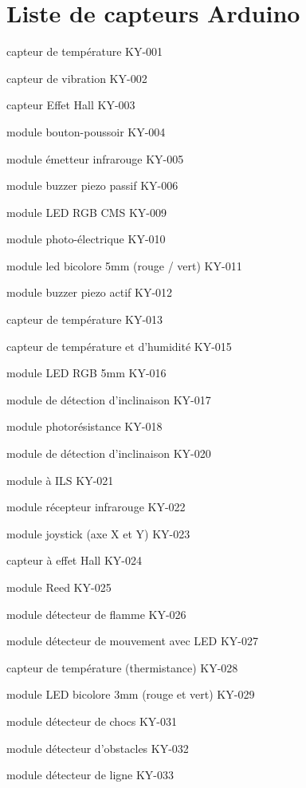 \section{Liste de capteurs Arduino}
\begin{liste}
    \item capteur de température KY-001
    \item capteur de vibration KY-002
    \item capteur Effet Hall KY-003
    \item module bouton-poussoir KY-004
    \item module émetteur infrarouge KY-005
    \item module buzzer piezo passif KY-006
    \item module LED RGB CMS KY-009 
    \item module photo-électrique KY-010 
    \item module led bicolore 5mm (rouge / vert) KY-011
    \item module buzzer piezo actif KY-012 
    \item capteur de température KY-013 
    \item capteur de température et d'humidité KY-015 
    \item module LED RGB 5mm KY-016 
    \item module de détection d'inclinaison KY-017 
    \item module photorésistance KY-018 
    \item module de détection d'inclinaison KY-020 
    \item module à ILS KY-021 
    \item module récepteur infrarouge KY-022 
    \item module joystick (axe X et Y) KY-023 
    \item capteur à effet Hall KY-024
    \item module Reed KY-025 
    \item module détecteur de flamme KY-026 
    \item module détecteur de mouvement avec LED KY-027 
    \item capteur de température (thermistance) KY-028 
    \item module LED bicolore 3mm (rouge et vert) KY-029 
    \item module détecteur de chocs KY-031 
    \item module détecteur d'obstacles KY-032 
    \item module détecteur de ligne KY-033 

\end{liste}
